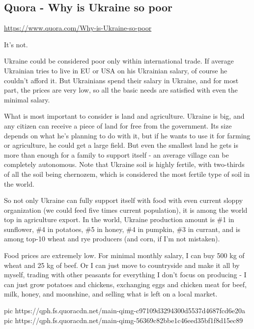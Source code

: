  
 

\subsection{Quora - Why is Ukraine so poor}
\label{sec:09_09_2020.sites.quora.1_ukraine_so_poor}

\url{https://www.quora.com/Why-is-Ukraine-so-poor}

It’s not.

Ukraine could be considered poor only within international trade. If average
Ukrainian tries to live in EU or USA on his Ukrainian salary, of course he
couldn’t afford it. But Ukrainians spend their salary in Ukraine, and for most
part, the prices are very low, so all the basic needs are satisfied with even
the minimal salary.

What is most important to consider is land and agriculture. Ukraine is big, and
any citizen can receive a piece of land for free from the government. Its size
depends on what he’s planning to do with it, but if he wants to use it for
farming or agriculture, he could get a large field. But even the smallest land
he gets is more than enough for a family to support itself - an average village
can be completely autonomous. Note that Ukraine soil is highly fertile, with
two-thirds of all the soil being chernozem, which is considered the most
fertile type of soil in the world.

So not only Ukraine can fully support itself with food with even current sloppy
organization (we could feed five times current population), it is among the
world top in agriculture export. In the world, Ukraine production amount is \#1
in sunflower, \#4 in potatoes, \#5 in honey, \#4 in pumpkin, \#3 in currant,
and is among top-10 wheat and rye producers (and corn, if I’m not mistaken).

Food prices are extremely low. For minimal monthly salary, I can buy 500 kg of
wheat and 25 kg of beef. Or I can just move to countryside and make it all by
myself, trading with other peasants for everything I don’t focus on producing -
I can just grow potatoes and chickens, exchanging eggs and chicken meat for
beef, milk, honey, and moonshine, and selling what is left on a local market.

\ifcmt
	pic https://qph.fs.quoracdn.net/main-qimg-c97109d3294300d5537d4687fcd6e20a
	pic https://qph.fs.quoracdn.net/main-qimg-56369c82bbe1c46eed35bf1f8d15ec89
\fi

